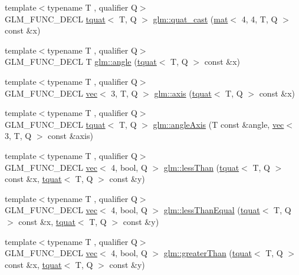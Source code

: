 \begin{DoxyCompactItemize}
{\footnotesize template$<$typename T , qualifier Q$>$ }\\G\+L\+M\+\_\+\+F\+U\+N\+C\+\_\+\+D\+E\+CL \hyperlink{structglm_1_1tquat}{tquat}$<$ T, Q $>$ \hyperlink{group__gtc__quaternion_ga50bb9aecf42fdab04e16039ab6a81c60}{glm\+::quat\+\_\+cast} (\hyperlink{structglm_1_1mat}{mat}$<$ 4, 4, T, Q $>$ const \&x)
\item 
{\footnotesize template$<$typename T , qualifier Q$>$ }\\G\+L\+M\+\_\+\+F\+U\+N\+C\+\_\+\+D\+E\+CL T \hyperlink{group__gtc__quaternion_gaaee6c856cae3217d274a240238cb6373}{glm\+::angle} (\hyperlink{structglm_1_1tquat}{tquat}$<$ T, Q $>$ const \&x)
\item 
{\footnotesize template$<$typename T , qualifier Q$>$ }\\G\+L\+M\+\_\+\+F\+U\+N\+C\+\_\+\+D\+E\+CL \hyperlink{structglm_1_1vec}{vec}$<$ 3, T, Q $>$ \hyperlink{group__gtc__quaternion_gaaf2707d3081789ce097daaa6e54d5287}{glm\+::axis} (\hyperlink{structglm_1_1tquat}{tquat}$<$ T, Q $>$ const \&x)
\item 
{\footnotesize template$<$typename T , qualifier Q$>$ }\\G\+L\+M\+\_\+\+F\+U\+N\+C\+\_\+\+D\+E\+CL \hyperlink{structglm_1_1tquat}{tquat}$<$ T, Q $>$ \hyperlink{group__gtc__quaternion_ga93856b8bfcdd5b9a164248df3149476c}{glm\+::angle\+Axis} (T const \&angle, \hyperlink{structglm_1_1vec}{vec}$<$ 3, T, Q $>$ const \&axis)
\item 
{\footnotesize template$<$typename T , qualifier Q$>$ }\\G\+L\+M\+\_\+\+F\+U\+N\+C\+\_\+\+D\+E\+CL \hyperlink{structglm_1_1vec}{vec}$<$ 4, bool, Q $>$ \hyperlink{group__gtc__quaternion_ga627487c769e33f4b9f318f271b75802c}{glm\+::less\+Than} (\hyperlink{structglm_1_1tquat}{tquat}$<$ T, Q $>$ const \&x, \hyperlink{structglm_1_1tquat}{tquat}$<$ T, Q $>$ const \&y)
\item 
{\footnotesize template$<$typename T , qualifier Q$>$ }\\G\+L\+M\+\_\+\+F\+U\+N\+C\+\_\+\+D\+E\+CL \hyperlink{structglm_1_1vec}{vec}$<$ 4, bool, Q $>$ \hyperlink{group__gtc__quaternion_ga9e84617bb109bf2eb7f30d7f4ba07ad4}{glm\+::less\+Than\+Equal} (\hyperlink{structglm_1_1tquat}{tquat}$<$ T, Q $>$ const \&x, \hyperlink{structglm_1_1tquat}{tquat}$<$ T, Q $>$ const \&y)
\item 
{\footnotesize template$<$typename T , qualifier Q$>$ }\\G\+L\+M\+\_\+\+F\+U\+N\+C\+\_\+\+D\+E\+CL \hyperlink{structglm_1_1vec}{vec}$<$ 4, bool, Q $>$ \hyperlink{group__gtc__quaternion_ga3f2720e2d77ec39186415f85ecd9cad0}{glm\+::greater\+Than} (\hyperlink{structglm_1_1tquat}{tquat}$<$ T, Q $>$ const \&x, \hyperlink{structglm_1_1tquat}{tquat}$<$ T, Q $>$ const \&y)

\end{DoxyCompactItemize}
